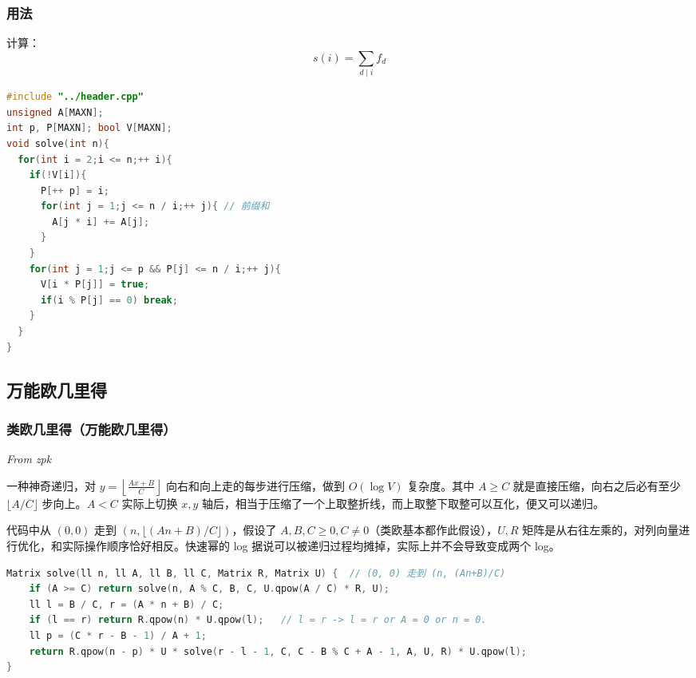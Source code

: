 \documentclass[10pt]{ctexart}
\begin{document}
\begin{multicols}{3}
    \subsubsection{用法}\label{ux7528ux6cd5-6}

    计算：\[s(i) = \sum_{d\mid i} f_{d}\]

\begin{lstlisting}[language={C++}]
#include "../header.cpp"
unsigned A[MAXN];
int p, P[MAXN]; bool V[MAXN];
void solve(int n){
  for(int i = 2;i <= n;++ i){
    if(!V[i]){
      P[++ p] = i;
      for(int j = 1;j <= n / i;++ j){ // 前缀和
        A[j * i] += A[j];
      }
    }
    for(int j = 1;j <= p && P[j] <= n / i;++ j){
      V[i * P[j]] = true;
      if(i % P[j] == 0) break;
    }
  }
}
\end{lstlisting}

    \subsection{万能欧几里得}\label{ux4e07ux80fdux6b27ux51e0ux91ccux5f97}

    \subsubsection{类欧几里得（万能欧几里得）}\label{ux7c7bux6b27ux51e0ux91ccux5f97ux4e07ux80fdux6b27ux51e0ux91ccux5f97}

    \emph{From zpk}

    一种神奇递归，对
    \(\displaystyle y=\left\lfloor \frac{Ax+B}{C}\right\rfloor\)
    向右和向上走的每步进行压缩，做到 \(O(\log V)\) 复杂度。其中
    \(A\ge C\) 就是直接压缩，向右之后必有至少 \(\lfloor A/C\rfloor\)
    步向上。\(A<C\) 实际上切换 \(x,y\)
    轴后，相当于压缩了一个上取整折线，而上取整下取整可以互化，便又可以递归。

    代码中从 \((0,0)\) 走到 \((n,\lfloor (An+B)/C\rfloor)\)，假设了
    \(A,B,C\ge 0,C\neq 0\)（类欧基本都作此假设），\(U,R\)
    矩阵是从右往左乘的，对列向量进行优化，和实际操作顺序恰好相反。快速幂的
    log 据说可以被递归过程均摊掉，实际上并不会导致变成两个 log。

\begin{lstlisting}[language={C++}]
Matrix solve(ll n, ll A, ll B, ll C, Matrix R, Matrix U) {  // (0, 0) 走到 (n, (An+B)/C)
    if (A >= C) return solve(n, A % C, B, C, U.qpow(A / C) * R, U);
    ll l = B / C, r = (A * n + B) / C;
    if (l == r) return R.qpow(n) * U.qpow(l);   // l = r -> l = r or A = 0 or n = 0.
    ll p = (C * r - B - 1) / A + 1;
    return R.qpow(n - p) * U * solve(r - l - 1, C, C - B % C + A - 1, A, U, R) * U.qpow(l);
}
\end{lstlisting}


\end{multicols}
\end{document}
